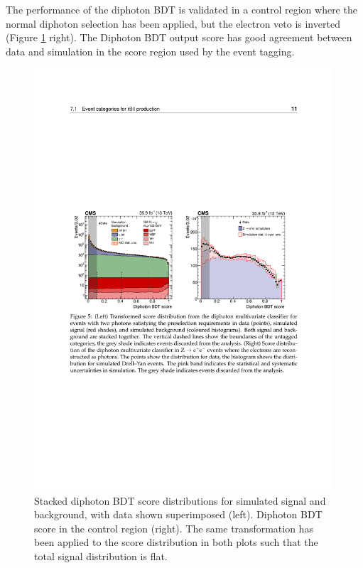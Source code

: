 The performance of the diphoton BDT is validated in a \Zee control region where the normal diphoton selection has been applied, but the electron veto is inverted (Figure \ref{fig:event_categorisaton:diphoton_bdt} right). The Diphoton BDT output score has good agreement between data and simulation in the score region used by the event tagging.
\begin{figure}[h!]
    \centering
        \includegraphics[width=0.99\textwidth]{figures/event_selection/diphoton_BDT.pdf}
    \caption{Stacked diphoton BDT score distributions for simulated signal and background, with data shown superimposed (left). Diphoton BDT score in the \Zee control region (right). 
             The same transformation has been applied to the score distribution in both plots such that the total signal distribution is flat.}
        \label{fig:event_categorisaton:diphoton_bdt}
\end{figure}


